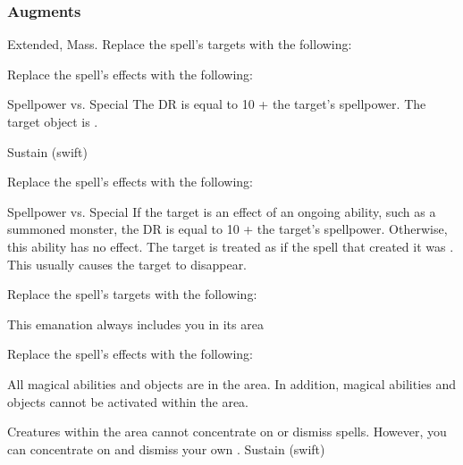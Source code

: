 \subsubsection{Augments}
 Extended, Mass.
Replace
the spell's targets with the following:
\begin{augmenttargetinginfo}
\end{augmenttargetinginfo}
Replace
the spell's effects with the following:
\begin{augmenteffects}
\begin{spellattack}{Spellpower vs. Special}
\spellspecial
The DR is equal to 10 + the target's spellpower.
\spellsuccess
The target object is .
\end{spellattack}
\spelldur Sustain (swift)
\end{augmenteffects}
Replace
the spell's effects with the following:
\begin{augmenteffects}
\begin{spellattack}{Spellpower vs. Special}
\spellspecial
If the target is an effect of an ongoing  ability, such as a summoned monster, the DR is equal to 10 + the target's spellpower.
Otherwise, this ability has no effect.
\spellsuccess
The target is treated as if the spell that created it was .
This usually causes the target to disappear.
\end{spellattack}
\end{augmenteffects}
Replace
the spell's targets with the following:
\begin{augmenttargetinginfo}
\spellspecial This emanation always includes you in its area
\end{augmenttargetinginfo}
Replace
the spell's effects with the following:
\begin{augmenteffects}
\spelleffect
All magical abilities and objects are  in the area.
In addition, magical abilities and objects cannot be activated within the area.
\par Creatures within the area cannot concentrate on or dismiss spells. However, you can concentrate on and dismiss your own .
\spelldur Sustain (swift)
\end{augmenteffects}
